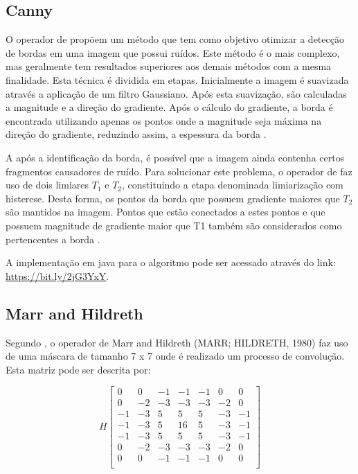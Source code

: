 \documentclass[
	12pt,				%
	oneside,			%
	a4paper,			%
	english,			%
	french,				%
	spanish,			%
	brazil,				%
	]{abntex2}
\begin{document}
\subsection{Canny}

O operador de \citet{canny:1986} propõem um método que tem como objetivo otimizar a detecção de bordas em uma imagem que possui ruídos. Este método é o mais complexo, mas geralmente tem resultados superiores aos demais métodos com a mesma finalidade. Esta técnica é dividida em etapas. Inicialmente a imagem é suavizada através a aplicação de um filtro Gaussiano. Após esta suavização, são calculadas a magnitude e a direção do gradiente. Após o cálculo do gradiente, a borda é encontrada utilizando apenas os pontos onde a magnitude seja máxima na direção do gradiente, reduzindo assim, a espessura da borda \cite{pedriniSchwartz:2008}.

A após a identificação da borda, é possível que a imagem ainda contenha certos fragmentos causadores de ruído. Para solucionar este problema, o operador de \citet{canny:1986} faz uso de dois limiares \(T_1\) e \(T_2\), constituindo a etapa denominada limiarização com histerese. Desta forma, os pontos da borda que possuem gradiente maiores que \(T_2\) são mantidos na imagem. Pontos que estão conectados a estes pontos e que possuem magnitude de gradiente maior que T1 também são considerados como pertencentes a borda \cite{pedriniSchwartz:2008}.

A implementação em java para o algoritmo pode ser acessado através do link: \url{https://bit.ly/2jG3YxY}.

\subsection{Marr and Hildreth}
Segundo \citet{pedriniSchwartz:2008}, o operador de Marr and Hildreth (MARR; HILDRETH, 1980) faz uso de uma máscara de tamanho 7 x 7 onde é realizado um processo de convolução. Esta matriz pode ser descrita por:

\[
H 
\begin{bmatrix}
     0 &  0 & -1 & -1 & -1 &  0 &  0            \\ 
     0 & -2 & -3 & -3 & -3 & -2 &  0            \\ 
    -1 & -3 &  5 &  5 &  5 & -3 & -1            \\ 
    -1 & -3 &  5 & 16 &  5 & -3 & -1            \\ 
    -1 & -3 &  5 &  5 &  5 & -3 & -1            \\ 
     0 & -2 & -3 & -3 & -3 & -2 &  0            \\ 
     0 &  0 & -1 & -1 & -1 &  0 &  0            \\ 
\end{bmatrix} 
\]
\end{document}
